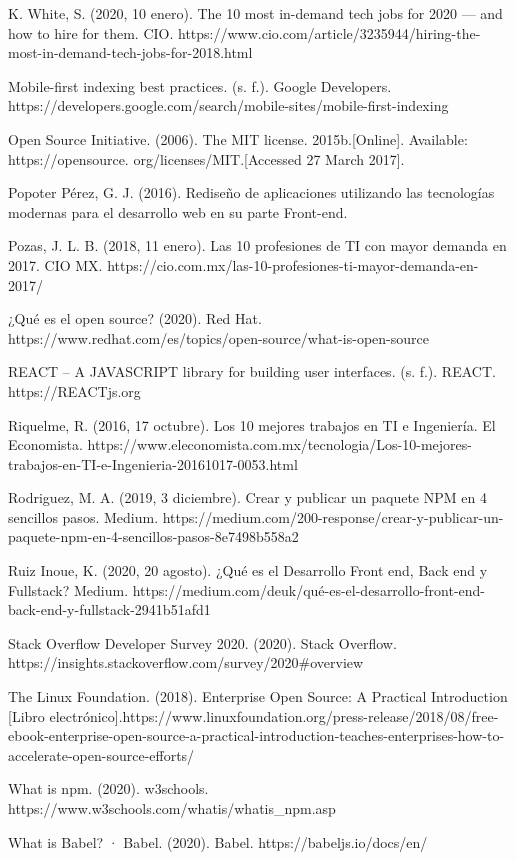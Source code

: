 \begin{thebibliography}{100}
\bibitem{} K. White, S. (2020, 10 enero). The 10 most in-demand tech jobs for 2020 — and how to hire for them. CIO. https://www.cio.com/article/3235944/hiring-the-most-in-demand-tech-jobs-for-2018.html

 Mobile-first indexing best practices. (s. f.). Google Developers. https://developers.google.com/search/mobile-sites/mobile-first-indexing


\bibitem{} Open Source Initiative. (2006). The MIT license. 2015b.[Online]. Available: https://opensource. org/licenses/MIT.[Accessed 27 March 2017].


 Popoter Pérez, G. J. (2016). Rediseño de aplicaciones utilizando las tecnologías modernas para el desarrollo web en su parte Front-end.


\bibitem{} Pozas, J. L. B. (2018, 11 enero). Las 10 profesiones de TI con mayor demanda en 2017. CIO MX. https://cio.com.mx/las-10-profesiones-ti-mayor-demanda-en-2017/

\bibitem{} ¿Qué es el open source? (2020). Red Hat. https://www.redhat.com/es/topics/open-source/what-is-open-source

 REACT – A JAVASCRIPT library for building user interfaces. (s. f.). REACT. https://REACTjs.org

 Riquelme, R. (2016, 17 octubre). Los 10 mejores trabajos en TI e Ingeniería. El Economista. https://www.eleconomista.com.mx/tecnologia/Los-10-mejores-trabajos-en-TI-e-Ingenieria-20161017-0053.html

 Rodriguez, M. A. (2019, 3 diciembre). Crear y publicar un paquete NPM en 4 sencillos pasos. Medium. https://medium.com/200-response/crear-y-publicar-un-paquete-npm-en-4-sencillos-pasos-8e7498b558a2

 Ruiz Inoue, K. (2020, 20 agosto). ¿Qué es el Desarrollo Front end, Back end y Fullstack? Medium. https://medium.com/deuk/qué-es-el-desarrollo-front-end-back-end-y-fullstack-2941b51afd1

 Stack Overflow Developer Survey 2020. (2020). Stack Overflow. https://insights.stackoverflow.com/survey/2020#overview

 The Linux Foundation. (2018). Enterprise Open Source: A Practical Introduction [Libro electrónico].https://www.linuxfoundation.org/press-release/2018/08/free-ebook-enterprise-open-source-a-practical-introduction-teaches-enterprises-how-to-accelerate-open-source-efforts/

 What is npm. (2020). w3schools. https://www.w3schools.com/whatis/whatis_npm.asp

 What is Babel? · Babel. (2020). Babel. https://babeljs.io/docs/en/



\end{thebibliography}